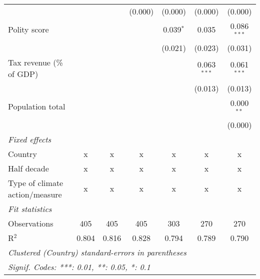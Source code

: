 \begin{tabular}{lcccccc}
                                                                                  &         &                & (0.000)        & (0.000)        & (0.000)        & (0.000)\\   
   Polity score                                                                   &         &                &                & 0.039$^{*}$    & 0.035          & 0.086$^{***}$\\   
                                                                                  &         &                &                & (0.021)        & (0.023)        & (0.031)\\   
   Tax revenue (\% of GDP)                                                        &         &                &                &                & 0.063$^{***}$  & 0.061$^{***}$\\   
                                                                                  &         &                &                &                & (0.013)        & (0.013)\\   
   Population total                                                               &         &                &                &                &                & 0.000$^{**}$\\   
                                                                                  &         &                &                &                &                & (0.000)\\   
   \emph{Fixed effects}\\
   Country                                                                        & x       & x              & x              & x              & x              & x\\  
   Half decade                                                                    & x       & x              & x              & x              & x              & x\\  
   Type of climate action/measure                                                 & x       & x              & x              & x              & x              & x\\  
   \midrule \emph{Fit statistics}\\
   Observations                                                                   & 405     & 405            & 405            & 303            & 270            & 270\\  
   R$^2$                                                                          & 0.804   & 0.816          & 0.828          & 0.794          & 0.789          & 0.790\\  
   \midrule
   \multicolumn{7}{l}{\emph{Clustered (Country) standard-errors in parentheses}}\\
   \multicolumn{7}{l}{\emph{Signif. Codes: ***: 0.01, **: 0.05, *: 0.1}}\\
\end{tabular}
\par\endgroup


